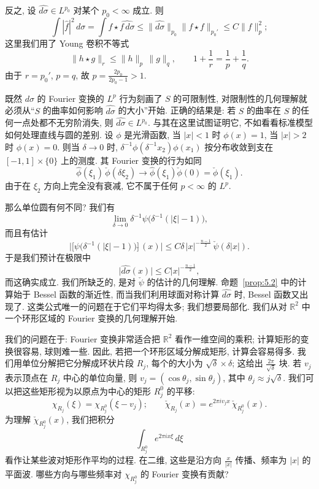 反之, 设 $\widehat{d\sigma}\in L^{p_0}$ 对某个 $p_0<\infty$ 成立. 则
\[
\int|\hat{f}|^{2}\,d\sigma=\int f\star\widehat{f\,d\sigma}
\leq\|\widehat{d\sigma}\|_{p_{0}}\|f\star f\|_{p_{0}'}
\leq C\|f\|_{p}^{2};
\]
这里我们用了 Young 卷积不等式
\[
\|h\star g\|_{r}\leq\|h\|_{p}\,\|g\|_{q},
\qquad
1+\frac{1}{r}=\frac{1}{p}+\frac{1}{q}.
\]
由于 $r=p_{0}'$, $p=q$, 故 $p=\frac{2p_{0}}{2p_{0}-1}>1$.

既然 $d\sigma$ 的 Fourier 变换的 $L^p$ 行为刻画了 $S$ 的可限制性, 对限制性的几何理解就必须从``$S$ 的曲率如何影响 $\widehat{d\sigma}$ 的大小''开始. 正确的结果是: 若 $S$ 的曲率在 $S$ 的任何一点处都不无穷阶消失, 则 $\widehat{d\sigma}\in L^{p_0}$. 与其在这里试图证明它, 不如看看标准模型如何处理直线与圆的差别. 设 $\phi$ 是光滑函数, 当 $|x|<1$ 时 $\phi(x)=1$, 当 $|x|>2$ 时 $\phi(x)=0$. 则当 $\delta\to 0$ 时, $\delta^{-1}\phi(\delta^{-1}x_2)\phi(x_1)$ 按分布收敛到支在 $[-1,1]\times\{0\}$ 上的测度. 其 Fourier 变换的行为如同
\[
\hat{\phi}(\xi_{1})\,\check{\phi}(\delta\xi_{2})\to\hat{\phi}(\xi_{1})\check{\phi}(0)=\check{\phi}(\xi_{1}).
\]
由于在 $\xi_{2}$ 方向上完全没有衰减, 它不属于任何 $p<\infty$ 的 $L^{p}$.

那么单位圆有何不同? 我们有
\[
\lim_{\delta\to0}\delta^{-1}\psi\bigl(\delta^{-1}(|\xi|-1)\bigr),
\]
而且有估计
\[
\bigl|\bigl[\psi\bigl(\delta^{-1}(|\xi|-1)\bigr)\bigr]\check{}\,(x)\bigr|\leq C\delta\,|x|^{-\frac{n-1}{2}}\,\check{\psi}(\delta|x|).
\]
于是我们预计在极限中
\[
\bigl|\widehat{d\sigma}(x)\bigr|\leq C|x|^{-\frac{n-1}{2}},
\]
而这确实成立. 我们所缺乏的, 是对 $\check{\psi}$ 的估计的几何理解. 命题~\ref{prop:5.2} 中的计算始于 Bessel 函数的渐近性, 而当我们利用球面对称计算 $\widehat{d\sigma}$ 时, Bessel 函数又出现了. 这类公式唯一的问题在于它们平均得太多; 我们想要局部化. 我们从对 $\mathbb{R}^2$ 中一个环形区域的 Fourier 变换的几何理解开始.


我们的问题在于: Fourier 变换非常适合把 $\mathbb{R}^2$ 看作一维空间的乘积; 计算矩形的变换很容易, 球则难一些. 因此, 若把一个环形区域分解成矩形, 计算会容易得多. 我们用单位分解把它分解成环状片段 $R_j$, 每个的大小为 $\sqrt{\delta}\times\delta$; 这给出 $\frac{2\pi}{\sqrt{\delta}}$ 块. 若 $v_j$ 表示顶点在 $R_j$ 中心的单位向量, 则 $v_j=(\cos\theta_j,\sin\theta_j)$, 其中 $\theta_j\approx j\sqrt{\delta}$. 我们可以把这些矩形视为以原点为中心的矩形 $R_j^0$ 的平移:
\[
\chi_{R_{j}}(\xi)=\chi_{R_{j}^{0}}(\xi-v_{j});
\qquad
\check{\chi}_{R_{j}}(x)=e^{2\pi iv_{j}x}\,\check{\chi}_{R_{j}^{0}}(x).
\]
为理解 $\check{\chi}_{R_{j}^{0}}(x)$, 我们把积分
\[
\int_{R_{j}^{0}}e^{2\pi ix\xi}\,d\xi
\]
看作让某些波对矩形作平均的过程. 在二维, 这些是沿方向 $\frac{x}{|x|}$ 传播、频率为 $|x|$ 的平面波. 哪些方向与哪些频率对 $\chi_{R_j^0}$ 的 Fourier 变换有贡献?

